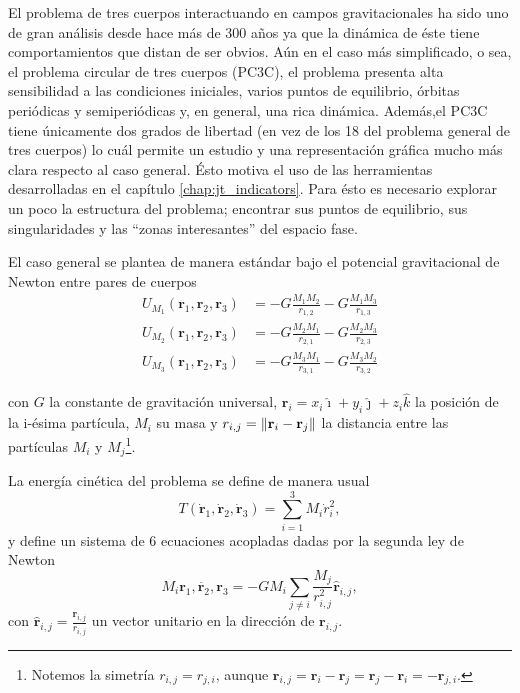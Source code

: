 
El problema de tres cuerpos interactuando en campos gravitacionales ha sido uno de gran análisis desde hace más de 300 años ya que la dinámica de éste tiene comportamientos que distan de ser obvios. Aún en el caso más simplificado, o sea, el problema circular de tres cuerpos (PC3C), el problema presenta alta sensibilidad a las condiciones iniciales, varios puntos de equilibrio, órbitas periódicas y semiperiódicas y, en general, una rica dinámica. Además,el PC3C tiene únicamente dos grados de libertad (en vez de los 18 del problema general de tres cuerpos) lo cuál permite un estudio y una representación gráfica mucho más clara respecto al caso general. Ésto motiva el uso de las herramientas desarrolladas en el capítulo \ref{chap:jt_indicators}. Para ésto es necesario explorar un poco la estructura del problema; encontrar sus puntos de equilibrio, sus singularidades y las ``zonas interesantes'' del espacio fase.

El caso general se plantea de manera estándar bajo el potencial gravitacional de Newton entre pares de cuerpos 
\begin{align}
 U_{M_1}(\mathbf{r}_1,\mathbf{r}_2,\mathbf{r}_3) &= -G \frac{M_1 M_2}{r_{1,2}} - G \frac{M_1 M_3}{r_{1,3}} \\
 U_{M_2}(\mathbf{r}_1,\mathbf{r}_2,\mathbf{r}_3) &= -G \frac{M_2 M_1}{r_{2,1}} - G \frac{M_2 M_3}{r_{2,3}} \\
 U_{M_3}(\mathbf{r}_1,\mathbf{r}_2,\mathbf{r}_3) &= -G \frac{M_3 M_1}{r_{3,1}} - G \frac{M_3 M_2}{r_{3,2}}
 \label{eq:3body_potential}
\end{align}

con $G$ la constante de gravitación universal, $\mathbf{r}_i = x_i \hat{\imath} + y_i \hat{\jmath} + z_i \hat{k}$ la posición de la i-ésima partícula, $M_i$ su masa y $r_{i,j} = \left\lVert \mathbf{r}_i - \mathbf{r}_j\right\rVert$ la distancia entre las partículas $M_i$ y $M_j$\footnote{Notemos la simetría $r_{i,j} = r_{j,i}$, aunque $\mathbf{r}_{i,j} = \mathbf{r}_i - \mathbf{r}_j = \mathbf{r}_j - \mathbf{r}_i  = - \mathbf{r}_{j,i}$.}. 

La energía cinética del problema se define de manera usual 
\begin{equation}
 T(\dot{\mathbf{r}}_1,\dot{\mathbf{r}}_2,\dot{\mathbf{r}}_3) = \sum_{i=1}^3 M_i \dot{r}_i^2,
 \label{eq:3body_kinetic}
\end{equation}
y define un sistema de 6 ecuaciones acopladas dadas por la segunda ley de Newton
\begin{equation}
 M_i \ddot{\mathbf{r}_1,\mathbf{r}_2,\mathbf{r}_3} = - G M_i \sum_{j\neq i} \frac{M_j}{r_{i,j}^2} \hat{\mathbf{r}}_{i,j},
 \label{eq:3body_eqs_motion}
\end{equation}
con $\hat{\mathbf{r}}_{i,j} = \frac{\mathbf{r}_{i,j}}{r_{i,j}}$ un vector unitario en la dirección de $\mathbf{r}_{i,j}$.

